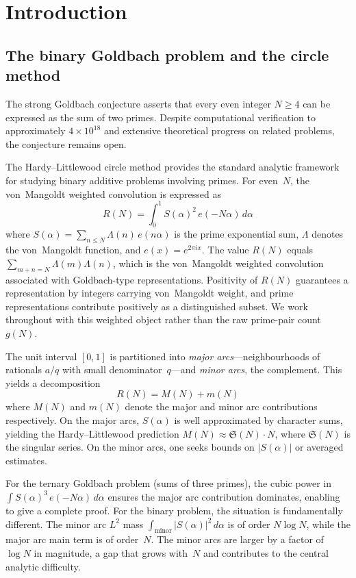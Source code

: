 \documentclass[11pt,a4paper]{article}
\newcommand{\RN}{R(N)}
\newcommand{\MN}{M(N)}
\newcommand{\mN}{m(N)}
\begin{document}
\section{Introduction}

\subsection{The binary Goldbach problem and the circle method}

The strong Goldbach conjecture asserts that every even integer $N \geq 4$ can be expressed as the sum of two primes. Despite computational verification to approximately $4 \times 10^{18}$ \citep{OliveiraSilva2014} and extensive theoretical progress on related problems, the conjecture remains open.

The Hardy--Littlewood circle method provides the standard analytic framework for studying binary additive problems involving primes. For even~$N$, the von~Mangoldt weighted convolution is expressed as
\begin{equation}\label{eq:RN}
\RN = \int_0^1 S(\alpha)^2\, e(-N\alpha)\, d\alpha
\end{equation}
where $S(\alpha) = \sum_{n \leq N} \Lambda(n)\, e(n\alpha)$ is the prime exponential sum, $\Lambda$ denotes the von~Mangoldt function, and $e(x) = e^{2\pi i x}$. The value $\RN$ equals $\sum_{m+n=N} \Lambda(m)\Lambda(n)$, which is the von~Mangoldt weighted convolution associated with Goldbach-type representations. Positivity of $\RN$ guarantees a representation by integers carrying von~Mangoldt weight, and prime representations contribute positively as a distinguished subset. We work throughout with this weighted object rather than the raw prime-pair count~$g(N)$.

The unit interval $[0,1]$ is partitioned into \emph{major arcs}---neighbourhoods of rationals $a/q$ with small denominator~$q$---and \emph{minor arcs}, the complement. This yields a decomposition
\begin{equation}\label{eq:decomp}
\RN = \MN + \mN
\end{equation}
where $\MN$ and $\mN$ denote the major and minor arc contributions respectively. On the major arcs, $S(\alpha)$ is well approximated by character sums, yielding the Hardy--Littlewood prediction $\MN \approx \mathfrak{S}(N) \cdot N$, where $\mathfrak{S}(N)$ is the singular series. On the minor arcs, one seeks bounds on $|S(\alpha)|$ or averaged estimates.

For the ternary Goldbach problem (sums of three primes), the cubic power in $\int S(\alpha)^3\, e(-N\alpha)\, d\alpha$ ensures the major arc contribution dominates, enabling \citet{Helfgott2013} to give a complete proof. For the binary problem, the situation is fundamentally different. The minor arc $L^2$ mass $\int_{\text{minor}} |S(\alpha)|^2\, d\alpha$ is of order $N \log N$, while the major arc main term is of order~$N$. The minor arcs are larger by a factor of $\log N$ in magnitude, a gap that grows with~$N$ and contributes to the central analytic difficulty.
\end{document}
